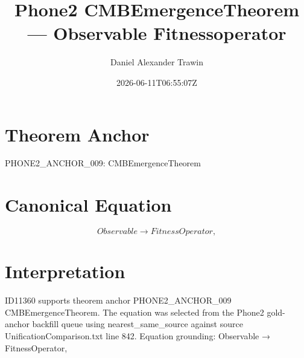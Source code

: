 \documentclass[11pt]{article}
\title{Phone2 CMBEmergenceTheorem — Observable Fitnessoperator}
\author{Daniel Alexander Trawin}
\date{2026-06-11T06:55:07Z}
\begin{document}
\maketitle
\section*{Theorem Anchor}
PHONE2_ANCHOR_009: CMBEmergenceTheorem
\section*{Canonical Equation}
\[
Observable → FitnessOperator,
\]
\section*{Interpretation}
ID11360 supports theorem anchor PHONE2_ANCHOR_009 CMBEmergenceTheorem. The equation was selected from the Phone2 gold-anchor backfill queue using nearest_same_source against source UnificationComparison.txt line 842. Equation grounding: Observable → FitnessOperator,
\end{document}
